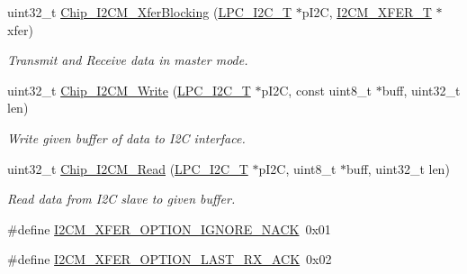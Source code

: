 \begin{DoxyCompactItemize}
uint32\+\_\+t \hyperlink{group___i2_c_m__18_x_x__43_x_x_ga3d8a7e3de0a4e192e4f40790b164869a}{Chip\+\_\+\+I2\+C\+M\+\_\+\+Xfer\+Blocking} (\hyperlink{struct_l_p_c___i2_c___t}{L\+P\+C\+\_\+\+I2\+C\+\_\+T} $\ast$p\+I2C, \hyperlink{struct_i2_c_m___x_f_e_r___t}{I2\+C\+M\+\_\+\+X\+F\+E\+R\+\_\+T} $\ast$xfer)
\begin{DoxyCompactList}\small\item\em Transmit and Receive data in master mode. \end{DoxyCompactList}\item 
uint32\+\_\+t \hyperlink{group___i2_c_m__18_x_x__43_x_x_ga6f18f520e51c790fef5009e9446f74d5}{Chip\+\_\+\+I2\+C\+M\+\_\+\+Write} (\hyperlink{struct_l_p_c___i2_c___t}{L\+P\+C\+\_\+\+I2\+C\+\_\+T} $\ast$p\+I2C, const uint8\+\_\+t $\ast$buff, uint32\+\_\+t len)
\begin{DoxyCompactList}\small\item\em Write given buffer of data to I2C interface. \end{DoxyCompactList}\item 
uint32\+\_\+t \hyperlink{group___i2_c_m__18_x_x__43_x_x_ga2b5c5865a132ea7ec17c13f496304474}{Chip\+\_\+\+I2\+C\+M\+\_\+\+Read} (\hyperlink{struct_l_p_c___i2_c___t}{L\+P\+C\+\_\+\+I2\+C\+\_\+T} $\ast$p\+I2C, uint8\+\_\+t $\ast$buff, uint32\+\_\+t len)
\begin{DoxyCompactList}\small\item\em Read data from I2C slave to given buffer. \end{DoxyCompactList}\end{DoxyCompactItemize}
\begin{DoxyCompactItemize}
\item 
\#define \hyperlink{group___i2_c_m__18_x_x__43_x_x_ga6a74607429c3695a49c0eac54032bf0c}{I2\+C\+M\+\_\+\+X\+F\+E\+R\+\_\+\+O\+P\+T\+I\+O\+N\+\_\+\+I\+G\+N\+O\+R\+E\+\_\+\+N\+A\+CK}~0x01
\item 
\#define \hyperlink{group___i2_c_m__18_x_x__43_x_x_gacf3efc16aa194fd73190c47dc2930a0c}{I2\+C\+M\+\_\+\+X\+F\+E\+R\+\_\+\+O\+P\+T\+I\+O\+N\+\_\+\+L\+A\+S\+T\+\_\+\+R\+X\+\_\+\+A\+CK}~0x02
\end{DoxyCompactItemize}
